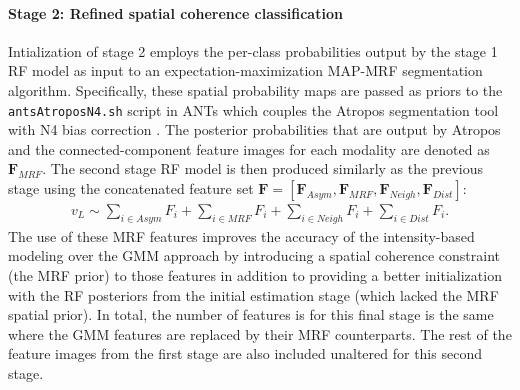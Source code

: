 \documentclass[preprint,authoryear,review,12pt]{elsarticle}
\begin{document}


\paragraph{Stage 2:  Refined spatial coherence classification}
Intialization of stage 2 employs the per-class probabilities output
by the stage 1 RF model as input to an expectation-maximization MAP-MRF 
segmentation algorithm.  
 Specifically, these spatial probability maps are passed as priors to the
{\tt antsAtroposN4.sh} script in ANTs which couples the Atropos 
segmentation tool \citep{avants2011} with N4 bias correction \citep{tustison2010}.
The posterior probabilities that are output by Atropos and the
connected-component feature images for each modality  are denoted as $\bm{F}_{MRF}$.    
The second stage RF model is then produced similarly as the previous stage
using the concatenated feature set $\bm{F}= [ \bm{F}_{Asym}, \bm{F}_{MRF},
\bm{F}_{Neigh}, \bm{F}_{Dist} ]$: 
\begin{align}
\label{eq:mapmrf}
 v_L \sim \sum_{i \in Asym} F_i + \sum_{i \in MRF} F_i + \sum_{i \in Neigh} F_i + \sum_{i \in Dist} F_i.
\end{align}
The use of these MRF features improves the accuracy of the 
intensity-based modeling over the GMM approach by introducing
a spatial coherence constraint (the MRF prior) to those features 
in addition to 
providing a better initialization with the RF posteriors from 
the initial estimation stage (which lacked the MRF spatial prior).  
In total, the number of features is for this final stage is the same
where the GMM features are replaced by their MRF counterparts.
The rest of the feature images from the first stage are also included unaltered for this second stage.
\end{document}
